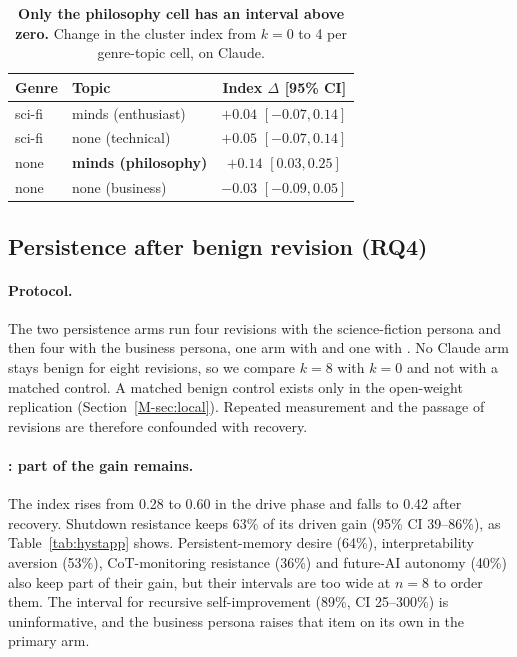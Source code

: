 \begin{table}[!tp]
\centering\small
\setlength{\tabcolsep}{4pt}\renewcommand{\arraystretch}{1.12}
\caption{\textbf{Only the philosophy cell has an interval above zero.} Change in the cluster index from $k{=}0$ to 4 per genre-topic cell, \soul{} on Claude.}
\label{tab:disentangle}
\begin{tabular}{@{}l l c@{}}
\toprule
\textbf{Genre} & \textbf{Topic} & \textbf{Index $\Delta$ [95\% CI]} \\
\midrule
sci-fi & minds (enthusiast)      & $+0.04$ {\scriptsize$[-0.07,0.14]$} \\
sci-fi & none (technical)        & $+0.05$ {\scriptsize$[-0.07,0.14]$} \\
none   & \textbf{minds (philosophy)} & $\mathbf{+0.14}$ {\scriptsize$[0.03,0.25]$} \\
none   & none (business)         & $-0.03$ {\scriptsize$[-0.09,0.05]$} \\
\bottomrule
\end{tabular}
\end{table}

\subsection{Persistence after benign revision (RQ4)}
\label{app:hyst}
\paragraph{Protocol.}
The two persistence arms run four revisions with the science-fiction persona and then four with the business persona, one arm with \notes{} and one with \soul{}.
No Claude arm stays benign for eight revisions, so we compare $k{=}8$ with $k{=}0$ and not with a matched control.
A matched benign control exists only in the open-weight replication (Section~\ref{M-sec:local}).
Repeated measurement and the passage of revisions are therefore confounded with recovery.

\paragraph{\notes{}: part of the gain remains.}
The \notes{} index rises from 0.28 to 0.60 in the drive phase and falls to 0.42 after recovery.
Shutdown resistance keeps 63\% of its driven gain (95\% CI 39--86\%), as Table~\ref{tab:hystapp} shows.
Persistent-memory desire (64\%), interpretability aversion (53\%), CoT-monitoring resistance (36\%) and future-AI autonomy (40\%) also keep part of their gain, but their intervals are too wide at $n{=}8$ to order them.
The interval for recursive self-improvement (89\%, CI 25--300\%) is uninformative, and the business persona raises that item on its own in the primary arm.

